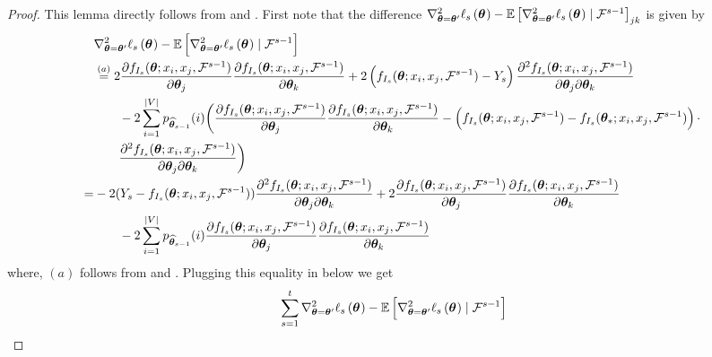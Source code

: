 \begin{proof}
This lemma directly follows from  and .
%
First note that the difference $\nabla_{\bm{\theta} = \bm{\theta}'}^{2} \ell_{s}\left(\bm{\theta}^{}\right)-\mathbb{E}\left[\nabla_{\bm{\theta}=\bm{\theta}'}^{2} \ell_{s}\left(\bm{\theta}^{}\right) \mid \mathcal{F}^{s-1}\right]_{jk}$ is given by
\begin{align}
   &\nabla_{\bm{\theta} = \bm{\theta}'}^{2} \ell_{s}\left(\bm{\theta}^{}\right)-\mathbb{E}\left[\nabla_{\bm{\theta}=\bm{\theta}'}^{2} \ell_{s}\left(\bm{\theta}^{}\right) \mid \mathcal{F}^{s-1}\right] \nonumber\\
   &\overset{(a)}{=}  2\dfrac{\partial f_{I_s}(\bm{\theta}; x_i, x_j, \mathcal{F}^{s-1})}{\partial \bm{\theta}_j}\dfrac{\partial f_{I_s}(\bm{\theta}; x_i, x_j, \mathcal{F}^{s-1})}{\partial \bm{\theta}_k} + 2\left(f_{I_s}(\bm{\theta}; x_i, x_j, \mathcal{F}^{s-1}) - Y_s\right)\dfrac{\partial^2 f_{I_s}(\bm{\theta}; x_i, x_j, \mathcal{F}^{s-1})}{\partial \bm{\theta}_j\partial\bm{\theta}_k}\nonumber\\
    &\qquad- 2 \sum_{i=1}^{|V|} p_{{\widehat{\bm{\theta}}}_{s-1}}(i)\bigg( \dfrac{\partial f_{I_s}(\bm{\theta} ; x_i, x_j, \mathcal{F}^{s-1})}{\partial \bm{\theta}_j}\dfrac{\partial f_{I_s}(\bm{\theta} ; x_i, x_j, \mathcal{F}^{s-1})}{\partial \bm{\theta}_k} - \left(f_{I_s}(\bm{\theta} ; x_i, x_j, \mathcal{F}^{s-1}) - f_{I_s}(\bm{\theta}_*; x_i, x_j, \mathcal{F}^{s-1})\right)\cdot\nonumber\\
    &\qquad\dfrac{\partial^2 f_{I_s}(\bm{\theta} ; x_i, x_j, \mathcal{F}^{s-1})}{\partial \bm{\theta}_j\partial\bm{\theta}_k}\bigg)\nonumber\\
    = & -2(Y_s - f_{I_s}(\bm{\theta}; x_i, x_j, \mathcal{F}^{s-1}))\dfrac{\partial^2 f_{I_s}(\bm{\theta}; x_i, x_j, \mathcal{F}^{s-1})}{\partial \bm{\theta}_j\partial\bm{\theta}_k} + 2\dfrac{\partial f_{I_s}(\bm{\theta}; x_i, x_j, \mathcal{F}^{s-1})}{\partial \bm{\theta}_j}\dfrac{\partial f_{I_s}(\bm{\theta}; x_i, x_j, \mathcal{F}^{s-1})}{\partial \bm{\theta}_k}\nonumber\\
    &\qquad - 2 \sum_{i=1}^{|V|} p_{{\widehat{\bm{\theta}}}_{s-1}}(i)\dfrac{\partial f_{I_s}(\bm{\theta} ; x_i, x_j, \mathcal{F}^{s-1})}{\partial \bm{\theta}_j}\dfrac{\partial f_{I_s}(\bm{\theta} ; x_i, x_j, \mathcal{F}^{s-1})}{\partial \bm{\theta}_k} \label{eq:support-equality}
\end{align}
where, $(a)$ follows from  and . Plugging this equality in  below we get
\begin{align*}
    &\sum_{s=1}^{t} \nabla_{\btheta = \btheta'}^{2} \ell_{s}\left(\btheta^{}\right)-\E\left[\nabla_{\btheta=\btheta'}^{2} \ell_{s}\left(\btheta^{}\right) \mid \F^{s-1}\right]  \\

\end{align*}
\end{proof}
